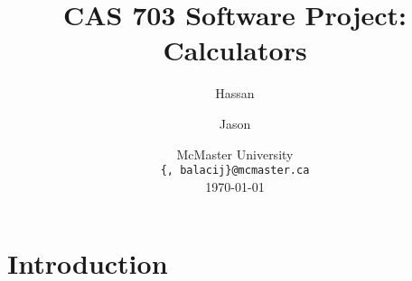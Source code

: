 \documentclass[11pt,fleqn]{article}
\title{\vspace{-3.5cm}CAS 703 Software Project: Calculators}
\author{Hassan \and Jason}
\date{
	McMaster University \\ \texttt{\{, balacij\}@mcmaster.ca}\\%
	\today
}
\begin{document}
\maketitle

\tableofcontents

\section{Introduction}

\end{document}
